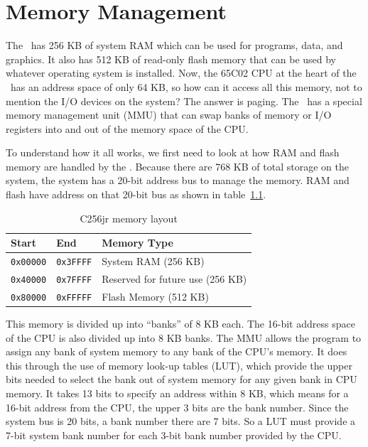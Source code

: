 \chapter{Memory Management}

The \jr\ has 256 KB of system RAM which can be used for programs, data, and graphics. It also has 512 KB of read-only flash memory that can be used by whatever operating system is installed. Now, the 65C02 CPU at the heart of the \jr\ has an address space of only 64 KB, so how can it access all this memory, not to mention the I/O devices on the system? The answer is paging. The \jr\ has a special memory management unit (MMU) that can swap banks of memory or I/O registers into and out of the memory space of the CPU.

To understand how it all works, we first need to look at how RAM and flash memory are handled by the \jr. Because there are 768 KB of total storage on the system, the system has a 20-bit address bus to manage the memory. RAM and flash have address on that 20-bit bus as shown in table~\ref{tab:memory}.

\begin{table}[ht]
	\begin{center}
		\begin{tabular}{| l | l | l |} \hline
			Start & End & Memory Type \\ \hline\hline
		  	\verb+0x00000+ & \verb+0x3FFFF+ & System RAM (256 KB)\\ \hline
			\verb+0x40000+ & \verb+0x7FFFF+ & Reserved for future use (256 KB)\\ \hline
		  	\verb+0x80000+ & \verb+0xFFFFF+ & Flash Memory (512 KB) \\ \hline
		\end{tabular}
	\end{center}
	\caption{C256jr memory layout}
	\label{tab:memory}
\end{table}

This memory is divided up into ``banks'' of 8 KB each. The 16-bit address space of the CPU is also divided up into 8 KB banks. The MMU allows the program to assign any bank of system memory to any bank of the CPU's memory. It does this through the use of memory look-up tables (LUT), which provide the upper bits needed to select the bank out of system memory for any given bank in CPU memory. It takes 13 bits to specify an address within 8 KB, which means for a 16-bit address from the CPU, the upper 3 bits are the bank number. Since the system bus is 20 bits, a bank number there are 7 bits. So a LUT must provide a 7-bit system bank number for each 3-bit bank number provided by the CPU.

